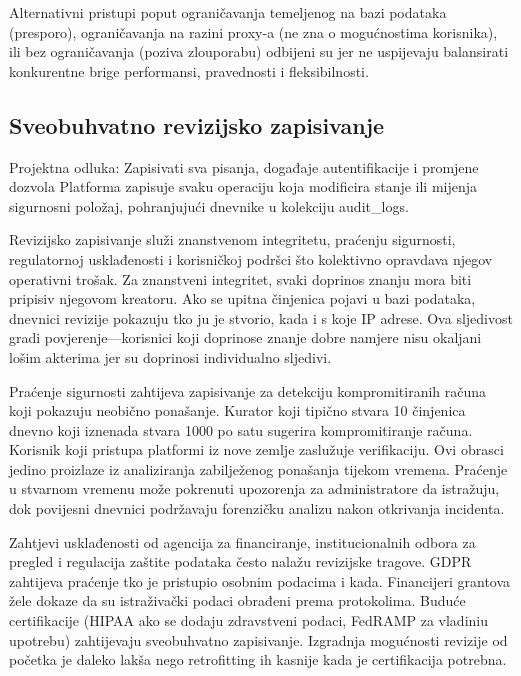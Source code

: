 \documentclass[12pt,a4paper]{article}
\begin{document}
Alternativni pristupi poput ograničavanja temeljenog na bazi podataka (presporo), ograničavanja na razini proxy-a (ne zna o mogućnostima korisnika), ili bez ograničavanja (poziva zlouporabu) odbijeni su jer ne uspijevaju balansirati konkurentne brige performansi, pravednosti i fleksibilnosti.

\subsection{Sveobuhvatno revizijsko zapisivanje}

\begin{rationale}{Projektna odluka: Zapisivati sva pisanja, događaje autentifikacije i promjene dozvola}
Platforma zapisuje svaku operaciju koja modificira stanje ili mijenja sigurnosni položaj, pohranjujući dnevnike u kolekciju audit\_logs.
\end{rationale}

Revizijsko zapisivanje služi znanstvenom integritetu, praćenju sigurnosti, regulatornoj usklađenosti i korisničkoj podršci što kolektivno opravdava njegov operativni trošak. Za znanstveni integritet, svaki doprinos znanju mora biti pripisiv njegovom kreatoru. Ako se upitna činjenica pojavi u bazi podataka, dnevnici revizije pokazuju tko ju je stvorio, kada i s koje IP adrese. Ova sljedivost gradi povjerenje—korisnici koji doprinose znanje dobre namjere nisu okaljani lošim akterima jer su doprinosi individualno sljedivi.

Praćenje sigurnosti zahtijeva zapisivanje za detekciju kompromitiranih računa koji pokazuju neobično ponašanje. Kurator koji tipično stvara 10 činjenica dnevno koji iznenada stvara 1000 po satu sugerira kompromitiranje računa. Korisnik koji pristupa platformi iz nove zemlje zaslužuje verifikaciju. Ovi obrasci jedino proizlaze iz analiziranja zabilježenog ponašanja tijekom vremena. Praćenje u stvarnom vremenu može pokrenuti upozorenja za administratore da istražuju, dok povijesni dnevnici podržavaju forenzičku analizu nakon otkrivanja incidenta.

Zahtjevi usklađenosti od agencija za financiranje, institucionalnih odbora za pregled i regulacija zaštite podataka često nalažu revizijske tragove. GDPR zahtijeva praćenje tko je pristupio osobnim podacima i kada. Financijeri grantova žele dokaze da su istraživački podaci obrađeni prema protokolima. Buduće certifikacije (HIPAA ako se dodaju zdravstveni podaci, FedRAMP za vladiniu upotrebu) zahtijevaju sveobuhvatno zapisivanje. Izgradnja mogućnosti revizije od početka je daleko lakša nego retrofitting ih kasnije kada je certifikacija potrebna.
\end{document}
